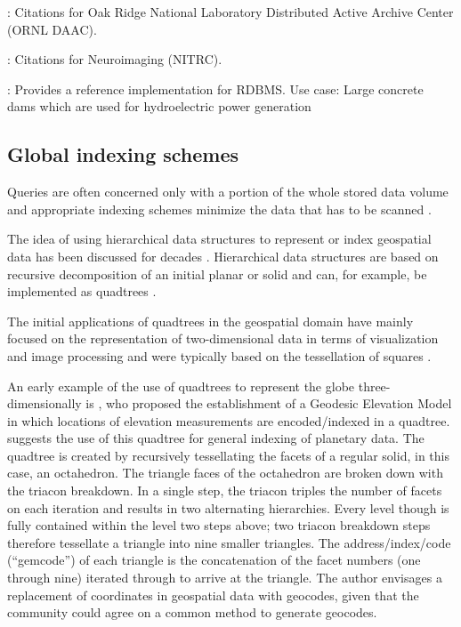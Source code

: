 \documentclass[letterpaper, parskip=half]{scrartcl}
\begin{document}
\citep{Cook2016}: Citations for Oak Ridge National Laboratory Distributed Active Archive Center (ORNL DAAC).

\citep{Honor2016}: Citations for Neuroimaging (NITRC).

\citep{Proll2013}: Provides a reference implementation for \gls{RDBMS}. Use case: Large concrete dams which are used for hydroelectric power generation

\newpage
\subsection{Global indexing schemes}


\label{lit_index}
Queries are often concerned only with a portion of the whole stored data volume and appropriate indexing schemes minimize the data that has to be scanned \citep{Kunszt2000}.

The idea of using hierarchical data structures to represent or index geospatial data has been discussed for decades \citep{Dutton1996, Samet1988}.
Hierarchical data structures are based on recursive decomposition of an initial planar or solid and can, for example, be implemented as quadtrees \citep{Samet1988}.

The initial applications of quadtrees in the geospatial domain have mainly focused on the representation of two-dimensional data in terms of visualization and image processing and were typically based on the tessellation of squares \citep{Lugo1995}.

An early example of the use of quadtrees to represent the globe three-dimensionally is \cite{Dutton1984}, who proposed the establishment of a Geodesic Elevation Model in which locations of elevation measurements are encoded/indexed in a quadtree. 
\cite{Dutton1989} suggests the use of this quadtree for general indexing of planetary data.
The quadtree is created by recursively tessellating the facets of a regular solid, in this case, an octahedron.
The triangle faces of the octahedron are broken down with the triacon breakdown. In a single step, the triacon triples the number of facets on each iteration and results in two alternating hierarchies. Every level though is fully contained within the level two steps above; two triacon breakdown steps therefore tessellate a triangle into nine smaller triangles. The address/index/code (``gemcode'') of each triangle is the concatenation of the facet numbers (one through nine) iterated through to arrive at the triangle. The author envisages a replacement of coordinates in geospatial data with geocodes, given that the community could agree on a common method to generate geocodes.
\end{document}
